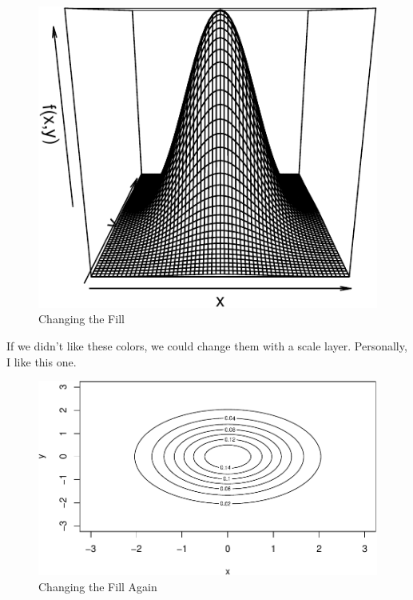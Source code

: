 \documentclass[
  12pt,
  krantz2]{krantz}
\makeatletter
\newenvironment{Shaded}{\begin{snugshade}}{\end{snugshade}}
\newcommand{\AttributeTok}[1]{\textcolor[rgb]{0.61,0.61,0.61}{#1}}
\newcommand{\DecValTok}[1]{\textcolor[rgb]{0.06,0.06,0.06}{#1}}
\newcommand{\FunctionTok}[1]{\textcolor[rgb]{0,0,0}{#1}}
\newcommand{\NormalTok}[1]{#1}
\newcommand{\OtherTok}[1]{\textcolor[rgb]{0.37,0.37,0.37}{#1}}
\newcommand{\SpecialCharTok}[1]{\textcolor[rgb]{0,0,0}{#1}}
\newenvironment{kframe}{%
\medskip{}
\setlength{\fboxsep}{.8em}
 \def\at@end@of@kframe{}%
 \ifinner\ifhmode%
  \def\at@end@of@kframe{\end{minipage}}%
  \begin{minipage}{\columnwidth}%
 \fi\fi%
 \def\FrameCommand##1{\hskip\@totalleftmargin \hskip-\fboxsep
 \colorbox{shadecolor}{##1}\hskip-\fboxsep
     \hskip-\linewidth \hskip-\@totalleftmargin \hskip\columnwidth}%
 \MakeFramed {\advance\hsize-\width
   \@totalleftmargin\z@ \linewidth\hsize
   \@setminipage}}%
 {\par\unskip\endMakeFramed%
 \at@end@of@kframe}
\renewenvironment{Shaded}{\begin{kframe}}{\end{kframe}}
\makeatother
\begin{document}
\begin{figure}
\centering
\includegraphics{r_and_python_book_files/figure-latex/unnamed-chunk-224-1.pdf}
\caption{\label{fig:unnamed-chunk-224}Changing the Fill}
\end{figure}

If we didn't like these colors, we could change them with a scale layer. Personally, I like this one.

\begin{Shaded}
\end{Shaded}

\begin{figure}
\centering
\includegraphics{r_and_python_book_files/figure-latex/unnamed-chunk-225-1.pdf}
\caption{\label{fig:unnamed-chunk-225}Changing the Fill Again}
\end{figure}
\end{document}

